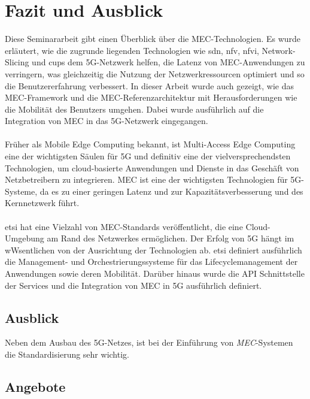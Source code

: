 \documentclass[runningheads]{llncs}
\numberwithin{figure}{section}
\begin{document}
\newpage

\section{Fazit und Ausblick}
Diese Seminararbeit gibt einen Überblick über die MEC-Technologien. Es wurde erläutert, wie die 
zugrunde liegenden
Technologien wie \acrshort{sdn}, \acrshort{nfv}, \acrshort{nfvi}, Network-Slicing und \acrshort{cups}
dem 5G-Netzwerk helfen, die Latenz von MEC-Anwendungen zu verringern, was gleichzeitig die Nutzung der
Netzwerkressourcen optimiert und so die Benutzererfahrung verbessert. In dieser Arbeit wurde auch gezeigt, 
wie das MEC-Framework und die MEC-Referenzarchitektur mit Herausforderungen wie die Mobilität des Benutzers
umgehen. Dabei wurde ausführlich auf die Integration von MEC in das 5G-Netzwerk eingegangen.
\\
\\
Früher als Mobile Edge Computing bekannt, ist Multi-Access Edge Computing eine der 
wichtigsten Säulen für 5G und  definitiv eine der vielversprechendsten Technologien, 
um cloud-basierte Anwendungen und Dienste in das Geschäft von Netzbetreibern zu integrieren.
MEC ist eine der wichtigsten Technologien für 5G-Systeme, 
da es zu einer geringen Latenz und zur Kapazitätsverbesserung und des Kernnetzwerk führt. 
\\
\\
\acrlong{etsi} hat eine Vielzahl von MEC-Standards veröffentlicht, die eine Cloud-Umgebung am Rand des 
Netzwerkes ermöglichen. Der Erfolg von 5G hängt im wWsentlichen von der Ausrichtung der Technologien ab.
\acrshort{etsi} definiert ausführlich die Management- und Orchestrierungssysteme für das Lifecyclemanagement der 
Anwendungen sowie deren Mobilität. Darüber hinaus wurde die API Schnittstelle der Services und die Integration
von MEC in 5G ausführlich definiert. 

\subsection{Ausblick}
Neben dem Ausbau des 5G-Netzes, ist bei der Einführung von \textit{MEC}-Systemen
die Standardisierung sehr wichtig.  \cite{abdullahSegmentRoutingSoftware21}
\subsection{Angebote}
\label{subsec:Angebote}
\label{sec:Ausblick}


\newpage
%
\printbibliography[heading=bibintoc]
\end{document}
